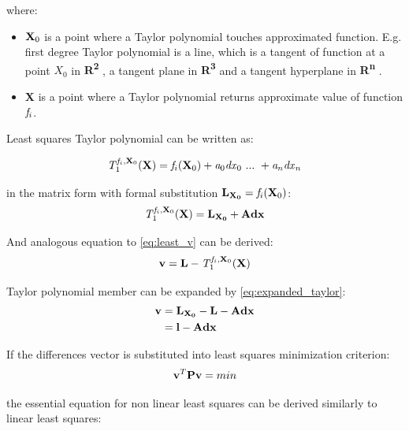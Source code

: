 \documentclass[a4paper,12pt]{article}
\newcommand{\ematr}[1]{
{\bf #1}
}
\newcommand{\evect}[1]{
{\bf #1}
}
\newcommand{\escal}[1]{
{\it #1}
}
\newcommand{\eucl}[1]{
{\bf R\textsuperscript{#1}}
}
\newcommand{\efunc}[1]{
{\it #1}
}
\begin{document}

where:
\begin{itemize}
\item $\evect{X}_{0}$ is a point where a Taylor polynomial touches approximated function. E.g. first degree Taylor polynomial 
      is a line, which is a tangent of function at a point $X_{0}$ in \eucl{2}, a tangent plane in \eucl{3} and  
      a tangent hyperplane in  \eucl{n}.
\item \evect{X} is a point where a Taylor polynomial returns approximate value of function $\efunc{f}_{i}$.
\end{itemize}

Least squares Taylor polynomial can be written as:

\begin{equation}
\efunc{T} ^{\efunc{f}_{i}, \evect{X}_{0}}_{1} (\evect{X}) =  \efunc{f}_{i}(\evect{X}_{0}) + \escal{a}_{0} \escal{dx}_{0} \ ... \ + \escal{a}_{n} \escal{dx}_{n} 
\end{equation} 

in the matrix form with formal substitution $\evect{L_{X_{0}}} = \efunc{f}_{i}(\evect{X}_{0})$:
\begin{equation}
\label{eq:expanded_taylor}
\efunc{T} ^{\efunc{f}_{i}, \evect{X}_{0}}_{1} (\evect{X}) = \evect{L_{X_{0}}} + \ematr{A}\evect{dx}
\end{equation} 

And analogous equation to \eqref{eq:least_v} can be derived:
\begin{equation}
\evect{v} = \evect{L} - \efunc{T} ^{\efunc{f}_{i}, \evect{X}_{0}}_{1} (\evect{X})
\end{equation} 
 
Taylor polynomial member can be expanded by \eqref{eq:expanded_taylor}:
\begin{equation}
\begin{split}
\evect{v} &=  \evect{L_{X_{0}}} - \evect{L} - \ematr{A}\evect{dx} \\
          &= \evect{l} - \ematr{A}\evect{dx}
\end{split}
\end{equation}

If the differences vector is substituted into least squares minimization criterion:
\begin{equation}
\label{eq:min_cond}
\evect{v}^{T}  \ematr{P} \evect{v} = min
\end{equation}

the essential equation for non linear least squares can be derived 
similarly to linear least squares:
\end{document}
